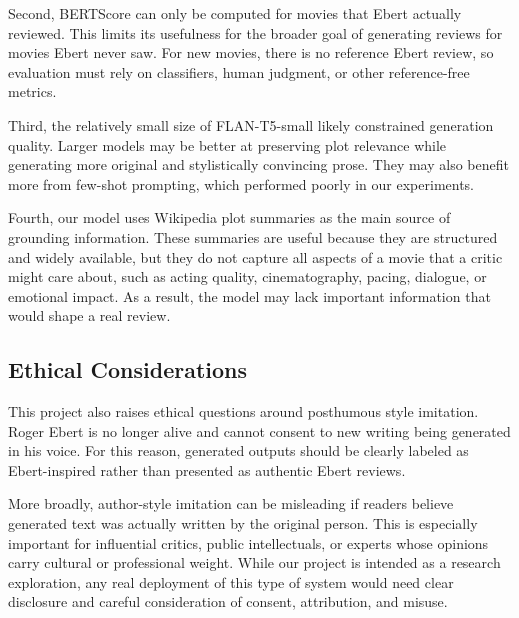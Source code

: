 Second, BERTScore can only be computed for movies that Ebert actually reviewed. This limits its usefulness for the broader goal of generating reviews for movies Ebert never saw. For new movies, there is no reference Ebert review, so evaluation must rely on classifiers, human judgment, or other reference-free metrics.

Third, the relatively small size of FLAN-T5-small likely constrained generation quality. Larger models may be better at preserving plot relevance while generating more original and stylistically convincing prose. They may also benefit more from few-shot prompting, which performed poorly in our experiments.

Fourth, our model uses Wikipedia plot summaries as the main source of grounding information. These summaries are useful because they are structured and widely available, but they do not capture all aspects of a movie that a critic might care about, such as acting quality, cinematography, pacing, dialogue, or emotional impact. As a result, the model may lack important information that would shape a real review.

\subsection{Ethical Considerations}

This project also raises ethical questions around posthumous style imitation. Roger Ebert is no longer alive and cannot consent to new writing being generated in his voice. For this reason, generated outputs should be clearly labeled as Ebert-inspired rather than presented as authentic Ebert reviews.

More broadly, author-style imitation can be misleading if readers believe generated text was actually written by the original person. This is especially important for influential critics, public intellectuals, or experts whose opinions carry cultural or professional weight. While our project is intended as a research exploration, any real deployment of this type of system would need clear disclosure and careful consideration of consent, attribution, and misuse.
